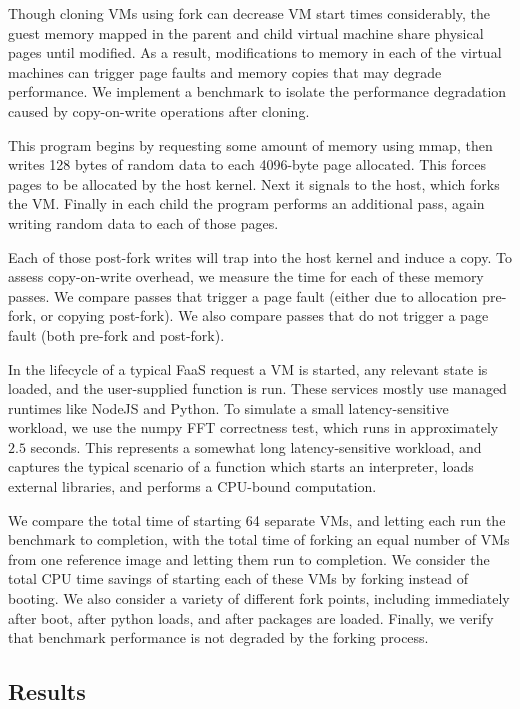 Though cloning VMs using fork can decrease VM start
times considerably, the guest memory mapped in the parent and child virtual
machine share physical pages until modified. As a result, modifications to
memory in each of the virtual machines can trigger page faults and memory
copies that may degrade performance. We implement a benchmark to isolate the
performance degradation caused by copy-on-write operations after cloning.

This program begins by requesting some amount of memory using mmap, then writes
128 bytes of random data to each 4096-byte page allocated. This forces pages to
be allocated by the host kernel. Next it signals to the host, which forks the
VM. Finally in each child the program performs an additional pass, again writing
random data to each of those pages.

Each of those post-fork writes will trap into the host kernel and induce a
copy. To assess copy-on-write overhead, we measure the time for each of these
memory passes. We compare passes that trigger a page fault (either due to
allocation pre-fork, or copying post-fork). We also compare passes that do not
trigger a page fault (both pre-fork and post-fork).

 In the lifecycle of a typical FaaS request a VM is
started, any relevant state is loaded, and the user-supplied function is run.
These services mostly use managed runtimes like NodeJS and Python. To simulate
a small latency-sensitive workload, we use the numpy FFT correctness test,
which runs in approximately $2.5$ seconds. This represents a somewhat long
latency-sensitive workload, and captures the typical scenario of a function
which starts an interpreter, loads external libraries, and performs a CPU-bound
computation.

We compare the total time of starting 64 separate VMs, and letting each run the
benchmark to completion, with the total time of forking an equal number of VMs
from one reference image and letting them run to completion. We consider the
total CPU time savings of starting each of these VMs by forking instead of
booting. We also consider a variety of different fork points, including
immediately after boot, after python loads, and after packages are
loaded. Finally, we verify that benchmark performance is not degraded by the
forking process.

\subsection{Results}

